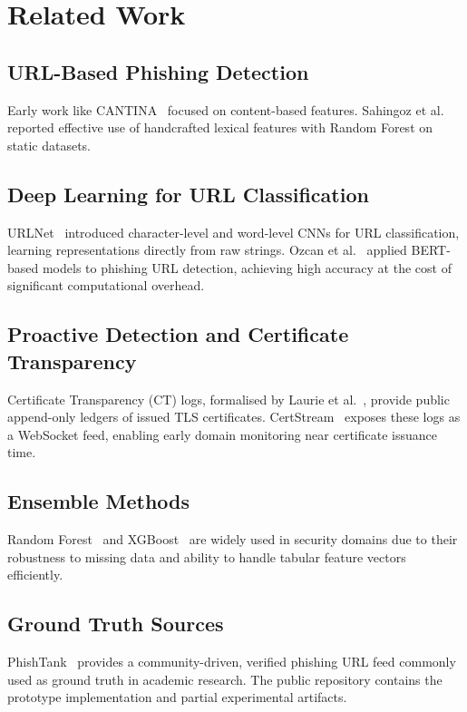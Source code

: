 \documentclass[conference]{IEEEtran}
\begin{document}
\section{Related Work}

\subsection{URL-Based Phishing Detection}
Early work like CANTINA~\cite{cantina} focused on content-based features. Sahingoz et al.~\cite{sahingoz2019} reported effective use of handcrafted lexical features with Random Forest on static datasets.

\subsection{Deep Learning for URL Classification}
URLNet~\cite{le_urlnet} introduced character-level and word-level CNNs for URL classification, learning representations directly from raw strings. Ozcan et al.~\cite{ozcan_bert} applied BERT-based models to phishing URL detection, achieving high accuracy at the cost of significant computational overhead.

\subsection{Proactive Detection and Certificate Transparency}
Certificate Transparency (CT) logs, formalised by Laurie et al.~\cite{laurie2013}, provide public append-only ledgers of issued TLS certificates. CertStream~\cite{certstream} exposes these logs as a WebSocket feed, enabling early domain monitoring near certificate issuance time.

\subsection{Ensemble Methods}
Random Forest~\cite{pedregosa2011} and XGBoost~\cite{xgboost} are widely used in security domains due to their robustness to missing data and ability to handle tabular feature vectors efficiently.

\subsection{Ground Truth Sources}
PhishTank~\cite{phishtank} provides a community-driven, verified phishing URL feed commonly used as ground truth in academic research. The public repository contains the prototype implementation and partial experimental artifacts.
\end{document}
